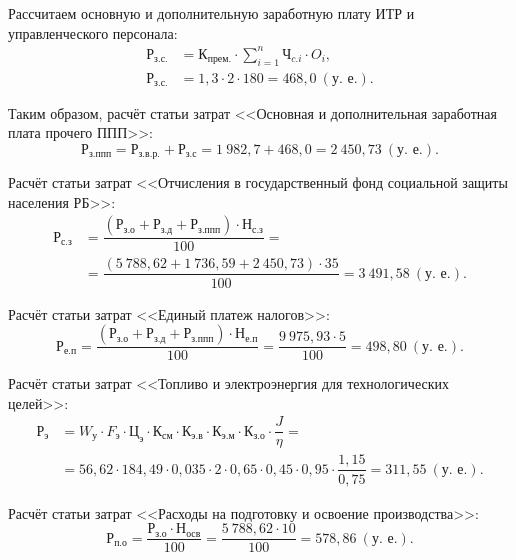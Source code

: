 Рассчитаем основную и дополнительную заработную плату ИТР и управленческого
персонала:
\begin{align*}
  \text{Р}_{\text{з.с.}} &= \text{К}_{\text{прем.}} \cdot \sum\limits_{i=1}^n \text{Ч}_{c.i} \cdot O_i, \\
  \text{Р}_{\text{з.с.}} &= 1{,}3 \cdot 2 \cdot 180 = 468{,}0~(\text{у.~е.}).
\end{align*}

Таким образом, расчёт статьи затрат <<Основная и дополнительная заработная плата
прочего ППП>>:
\begin{equation*}
\text{Р}_{\text{з.ппп}} = \text{Р}_{\text{з.в.р.}} + \text{Р}_{\text{з.с}} =
1~982{,}7+468{,}0 = 2~450{,}73~(\text{у.~е.}).
\end{equation*}


Расчёт статьи затрат
<<Отчисления в государственный фонд социальной защиты населения РБ>>:
\begin{align*}
\text{Р}_{\text{с.з}} &=
\dfrac{
  (\text{Р}_{\text{з.о}} + \text{Р}_{\text{з.д}}  + \text{Р}_{\text{з.ппп}}) \cdot \text{Н}_{\text{с.з}}
}{
  100
} = \\
&= \dfrac{( 5~788{,}62 + 1~736{,}59 + 2~450{,}73 ) \cdot 35}{100} =
3~491{,}58~(\text{у.~е.}).
\end{align*}

Расчёт статьи затрат
<<Единый платеж налогов>>:
\begin{equation*}
\text{Р}_{\text{е.п}} =
\dfrac{
  (\text{Р}_{\text{з.о}} + \text{Р}_{\text{з.д}}  + \text{Р}_{\text{з.ппп}}) \cdot \text{Н}_{\text{е.п}}
}{
  100
} =
\dfrac{9~975{,}93 \cdot 5}{100} =
498{,}80 \: (\text{у.~е.}).
\end{equation*}

Расчёт статьи затрат
<<Топливо и электроэнергия для технологических целей>>:
\begin{align*}
\text{Р}_{\text{э}} &=
W_{\text{у}} \cdot F_{\text{э}} \cdot \text{Ц}_{\text{э}} \cdot
\text{К}_{\text{см}} \cdot \text{К}_{\text{э.в}} \cdot
\text{К}_{\text{э.м}} \cdot \text{К}_{\text{з.о}} \cdot
\dfrac{J}{\eta} = \\
 &=
56{,}62 \cdot 184{,}49 \cdot 0{,}035 \cdot
2 \cdot 0{,}65 \cdot 0{,}45 \cdot 0{,}95 \cdot
\dfrac{1{,}15}{0{,}75} = 311{,}55~(\text{у.~е.}).
\end{align*}

Расчёт статьи затрат
<<Расходы на подготовку и освоение производства>>:
\begin{equation*}
\text{Р}_{\text{п.о}} =
\dfrac{
  \text{Р}_{\text{з.о}} \cdot \text{Н}_{\text{осв}}
}{
  100
} =
\dfrac{5~788{,}62 \cdot 10}{100} =
578{,}86~(\text{у.~е.}).
\end{equation*}

